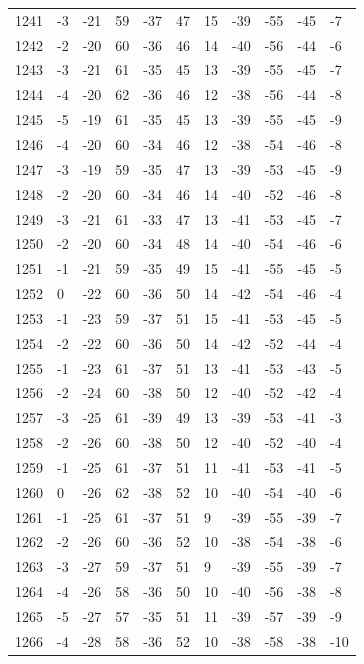 \begin{table}[H]
\begin{tabular}{lllllllllll}
1241 & -3 & -21 & 59 & -37 & 47 & 15 & -39 & -55 & -45 & -7 \\
1242 & -2 & -20 & 60 & -36 & 46 & 14 & -40 & -56 & -44 & -6 \\
1243 & -3 & -21 & 61 & -35 & 45 & 13 & -39 & -55 & -45 & -7 \\
1244 & -4 & -20 & 62 & -36 & 46 & 12 & -38 & -56 & -44 & -8 \\
1245 & -5 & -19 & 61 & -35 & 45 & 13 & -39 & -55 & -45 & -9 \\
1246 & -4 & -20 & 60 & -34 & 46 & 12 & -38 & -54 & -46 & -8 \\
1247 & -3 & -19 & 59 & -35 & 47 & 13 & -39 & -53 & -45 & -9 \\
1248 & -2 & -20 & 60 & -34 & 46 & 14 & -40 & -52 & -46 & -8 \\
1249 & -3 & -21 & 61 & -33 & 47 & 13 & -41 & -53 & -45 & -7 \\
1250 & -2 & -20 & 60 & -34 & 48 & 14 & -40 & -54 & -46 & -6 \\
1251 & -1 & -21 & 59 & -35 & 49 & 15 & -41 & -55 & -45 & -5 \\
1252 & 0 & -22 & 60 & -36 & 50 & 14 & -42 & -54 & -46 & -4 \\
1253 & -1 & -23 & 59 & -37 & 51 & 15 & -41 & -53 & -45 & -5 \\
1254 & -2 & -22 & 60 & -36 & 50 & 14 & -42 & -52 & -44 & -4 \\
1255 & -1 & -23 & 61 & -37 & 51 & 13 & -41 & -53 & -43 & -5 \\
1256 & -2 & -24 & 60 & -38 & 50 & 12 & -40 & -52 & -42 & -4 \\
1257 & -3 & -25 & 61 & -39 & 49 & 13 & -39 & -53 & -41 & -3 \\
1258 & -2 & -26 & 60 & -38 & 50 & 12 & -40 & -52 & -40 & -4 \\
1259 & -1 & -25 & 61 & -37 & 51 & 11 & -41 & -53 & -41 & -5 \\
1260 & 0 & -26 & 62 & -38 & 52 & 10 & -40 & -54 & -40 & -6 \\
1261 & -1 & -25 & 61 & -37 & 51 & 9 & -39 & -55 & -39 & -7 \\
1262 & -2 & -26 & 60 & -36 & 52 & 10 & -38 & -54 & -38 & -6 \\
1263 & -3 & -27 & 59 & -37 & 51 & 9 & -39 & -55 & -39 & -7 \\
1264 & -4 & -26 & 58 & -36 & 50 & 10 & -40 & -56 & -38 & -8 \\
1265 & -5 & -27 & 57 & -35 & 51 & 11 & -39 & -57 & -39 & -9 \\
1266 & -4 & -28 & 58 & -36 & 52 & 10 & -38 & -58 & -38 & -10 \\

\end{tabular}
\end{table}
